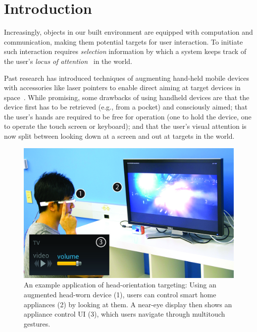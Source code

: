 \section{Introduction}

Increasingly, objects in our built environment are equipped with computation and communication, making them potential targets for user interaction. 
To initiate such interaction requires {\em selection} information by which a system keeps track of the user's {\em locus of attention}~\cite{raskin} in the world.

Past research has introduced techniques of augmenting hand-held mobile devices with accessories like laser pointers to enable direct aiming at target devices in space~\cite{beigl_point_1999,patel_2-way_2003}. While promising, some drawbacks of using handheld devices are that the device first has to be retrieved (e.g., from a pocket) and consciously aimed; that the user's hands are required to be free for operation (one to hold the device, one to operate the touch screen or keyboard); and that the user's visual attention is now split between looking down at a screen and out at targets in the world. 

\begin{figure}[t]
\centering
\includegraphics[width=1.0\columnwidth]{figures/teaser.jpg}
\caption{An example application of head-orientation targeting: Using an augmented head-worn device (1), users can control smart home appliances (2) by looking at them. A near-eye display then shows an appliance control UI (3), which users navigate through multitouch gestures.}
\label{fig:teaser}
\end{figure}

